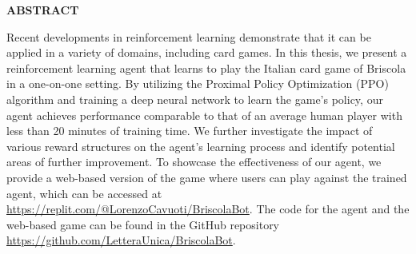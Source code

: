 \begin{center}
    \bf ABSTRACT
\end{center}
Recent developments in reinforcement learning demonstrate that it can be applied in a variety of domains, including card games. In this thesis, we present a reinforcement learning agent that learns to play the Italian card game of Briscola in a one-on-one setting. By utilizing the Proximal Policy Optimization (PPO) algorithm and training a deep neural network to learn the game's policy, our agent achieves performance comparable to that of an average human player with less than 20 minutes of training time. We further investigate the impact of various reward structures on the agent's learning process and identify potential areas of further improvement. To showcase the effectiveness of our agent, we provide a web-based version of the game where users can play against the trained agent, which can be accessed at \url{https://replit.com/@LorenzoCavuoti/BriscolaBot}. The code for the agent and the web-based game can be found in the GitHub repository \url{https://github.com/LetteraUnica/BriscolaBot}.